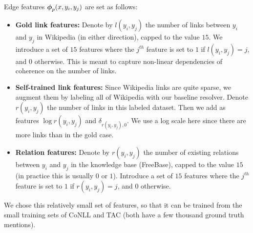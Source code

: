 Edge features $\boldsymbol{\phi}_p(x,y_i,y_j)$ are set as follows:
\begin{itemize}
\item {\bf Gold link features:} Denote by $l(y_i,y_j)$ the number of links between $y_i$ and $y_j$ in Wikipedia (in either direction), capped to the value $15$. We introduce a set of $15$ features where the $j^{th}$ feature is set to $1$ if $l(y_i,y_j) = j$, and $0$ otherwise. This is meant to capture non-linear dependencies of coherence
on the number of links.
\item {\bf Self-trained link features:} Since Wikipedia links are quite sparse, we augment them by labeling all of Wikipedia with our baseline resolver. %
Denote $r(y_i,y_j)$ the number of links in this labeled dataset. Then we add as features $\log{r(y_i,y_j)}$ and $\delta_{r(y_i,y_j),0}$. We use a log scale here since there are more links than in the gold case. 
\item {\bf Relation features:} Denote by $r(y_i,y_j)$ the number of existing relations between $y_i$ and $y_j$ in the knowledge base (FreeBase), capped to the value $15$ (in practice this is usually $0$ or $1$). Introduce a set of $15$ features where the $j^{th}$ feature is set to $1$ if $r(y_i,y_j) = j$, and $0$ otherwise. 
\end{itemize}
We chose this relatively small set of features, so that it can be trained from the small training sets of CoNLL and TAC (both have a few thousand ground truth mentions).